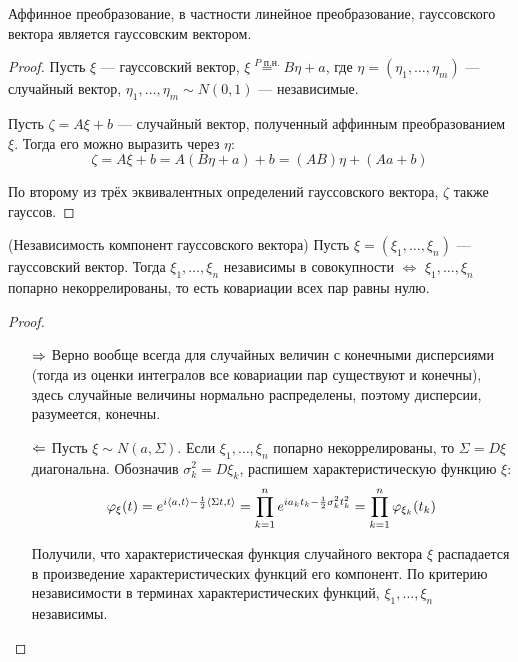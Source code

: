\begin{corollary}
    Аффинное преобразование, в частности линейное преобразование, гауссовского вектора является гауссовским вектором.
\end{corollary}

\begin{proof}
    Пусть $\xi$ --- гауссовский вектор, $\xi \stackrel{P\text{ п.н.}}{=} B\eta + a$, где $\eta = (\eta_1, \ldots, \eta_m)$ --- случайный вектор, $\eta_1, \ldots, \eta_m \sim N(0, 1)$ --- независимые.
    
    Пусть $\zeta = A \xi + b$ --- случайный вектор, полученный аффинным преобразованием $\xi$. Тогда его можно выразить через $\eta$:
    \[
        \zeta = A \xi + b = A (B\eta + a) + b = (AB)\eta +(Aa + b)
    \]

    По второму из трёх эквивалентных определений гауссовского вектора, $\zeta$ также гауссов.
\end{proof}

\begin{corollary} (Независимость компонент гауссовского вектора)
    Пусть $\xi = (\xi_1, \ldots, \xi_n)$ --- гауссовский вектор. Тогда $\xi_1, \ldots, \xi_n$ независимы в совокупности $\Leftrightarrow$ $\xi_1, \ldots, \xi_n$ попарно некоррелированы, то есть ковариации всех пар равны нулю.
\end{corollary}

\begin{proof}~
    \begin{itemize}
        \item[$\Rightarrow$] Верно вообще всегда для случайных величин с конечными дисперсиями (тогда из оценки интегралов все ковариации пар существуют и конечны), здесь случайные величины нормально распределены, поэтому дисперсии, разумеется, конечны.

        \item[$\Leftarrow$] Пусть $\xi \sim N(a, \Sigma)$. Если $\xi_1, \ldots, \xi_n$ попарно некоррелированы, то $\Sigma = D\xi$ диагональна. Обозначив $\sigma_k^2 = D \xi_k$, распишем характеристическую функцию $\xi$:
        \[
            \varphi_\xi(t) = e^{i \left\langle a, t\right\rangle - \frac{1}{2} \left\langle\Sigma t, t\right\rangle} = \prod_{k = 1}^n e^{i a_k t_k - \frac{1}{2} \sigma_k^2 t_k^2} = \prod_{k = 1}^n \varphi_{\xi_k}(t_k)
        \]

        Получили, что характеристическая функция случайного вектора $\xi$ распадается в произведение характеристических функций его компонент. По критерию независимости в терминах характеристических функций, $\xi_1, \ldots, \xi_n$ независимы.
    \end{itemize}
\end{proof}


